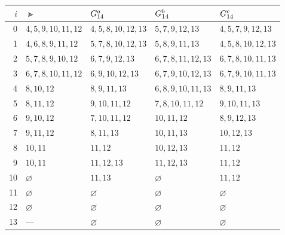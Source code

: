 \begin{tabular}{@{}rllll@{}}
\toprule
$i$ & $\Gt$ & $G_{14}^{a}$ & $G_{14}^{b}$ & $G_{14}^{c}$ \\
\midrule
0 & $4,5,9,10,11,12$ & $4,5,8,10,12,13$ & $5,7,9,12,13$ & $4,5,7,9,12,13$ \\
1 & $4,6,8,9,11,12$ & $5,7,8,10,12,13$ & $5,8,9,11,13$ & $4,5,8,10,12,13$ \\
2 & $5,7,8,9,10,12$ & $6,7,9,12,13$ & $6,7,8,11,12,13$ & $6,7,8,10,11,13$ \\
3 & $6,7,8,10,11,12$ & $6,9,10,12,13$ & $6,7,9,10,12,13$ & $6,7,9,10,11,13$ \\
4 & $8,10,12$ & $8,9,11,13$ & $6,8,9,10,11,13$ & $8,9,11,13$ \\
5 & $8,11,12$ & $9,10,11,12$ & $7,8,10,11,12$ & $9,10,11,13$ \\
6 & $9,10,12$ & $7,10,11,12$ & $10,11,12$ & $8,9,12,13$ \\
7 & $9,11,12$ & $8,11,13$ & $10,11,13$ & $10,12,13$ \\
8 & $10,11$ & $11,12$ & $10,12,13$ & $11,12$ \\
9 & $10,11$ & $11,12,13$ & $11,12,13$ & $11,12$ \\
10 & $\varnothing$ & $11,13$ & $\varnothing$ & $11,12$ \\
11 & $\varnothing$ & $\varnothing$ & $\varnothing$ & $\varnothing$ \\
12 & $\varnothing$ & $\varnothing$ & $\varnothing$ & $\varnothing$ \\
13 & --- & $\varnothing$ & $\varnothing$ & $\varnothing$ \\
\bottomrule
\end{tabular}
